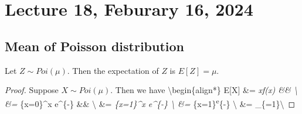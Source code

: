 \documentclass[
]{book}
\theoremstyle{definition}
\theoremstyle{definition}
\theoremstyle{definition}
\theoremstyle{definition}
\theoremstyle{remark}
\begin{document}
\hypertarget{lecture-18-feburary-16-2024}{%
\chapter{Lecture 18, Feburary 16, 2024}\label{lecture-18-feburary-16-2024}}

\hypertarget{mean-of-poisson-distribution}{%
\section{Mean of Poisson distribution}\label{mean-of-poisson-distribution}}

Let \(Z\sim Poi(\mu)\). Then the expectation of \(Z\) is \(E[Z] = \mu\).

\begin{proof}
Suppose \(X \sim Poi(\mu)\). Then we have
\textbackslash begin\{align*\}
E{[}X{]} \&= \sum\limits\emph{ x\cdot f(x) \&\& \textbackslash{}
\&= \sum}\{x=0\}\^{}\infty x \cdot e\^{}\{-\mu\}  \&\& \textbackslash{}
\&= \sum\emph{\{x=1\}\^{}\infty x \cdot e\^{}\{-\mu\} \textbackslash{}
\&= \mu \sum}\{x=1\}\textsuperscript{\infty e}\{-\mu\} \textbackslash{}
\&= \mu {}\_\{=1\}\textbackslash{}
\end{proof}

  
\end{document}

